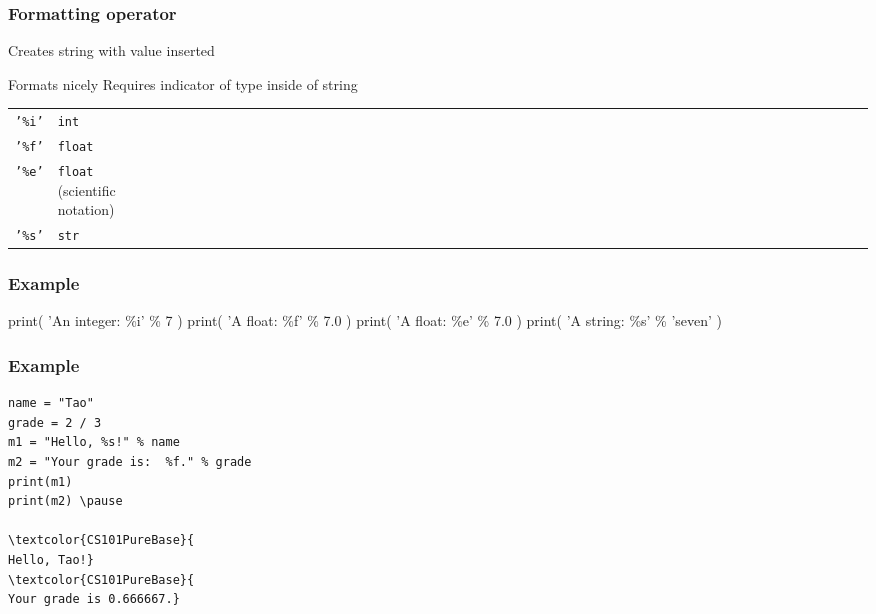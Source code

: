 \documentclass[11pt]{beamer}
\begin{document}
\begin{frame}
  \frametitle{Formatting operator}
  \Enlarge

  \begin{itemize}
  \myitem  Creates string with value inserted
    \begin{itemize}
    \mysubitem  Formats nicely
    \mysubitem  Requires indicator of type inside of string
      \begin{tabular}{*{27}{ll}}
        \texttt{'\%i'} & \texttt{int} \\
        \texttt{'\%f'} & \texttt{float} \\
        \texttt{'\%e'} & \texttt{float} (scientific notation) \\
        \texttt{'\%s'} & \texttt{str}
      \end{tabular}
    \end{itemize}
  \end{itemize}
\end{frame}

\begin{frame}[fragile]
  \frametitle{Example}
  \Enlarge

  \begin{semiverbatim}
print( 'An integer:  \%i' \% 7 )
print( 'A float:     \%f' \% 7.0 )
print( 'A float:     \%e' \% 7.0 )
print( 'A string:    \%s' \% 'seven' )
  \end{semiverbatim}
\end{frame}

\begin{frame}[fragile]
  \frametitle{Example}
  \Enlarge

  \begin{Verbatim}[commandchars=\\\{\}]
name = "Tao"
grade = 2 / 3
m1 = "Hello, %s!" % name
m2 = "Your grade is:  %f." % grade
print(m1)
print(m2) \pause

\textcolor{CS101PureBase}{
Hello, Tao!}
\textcolor{CS101PureBase}{
Your grade is 0.666667.} 
\end{Verbatim}

\end{frame} 
\end{document}
